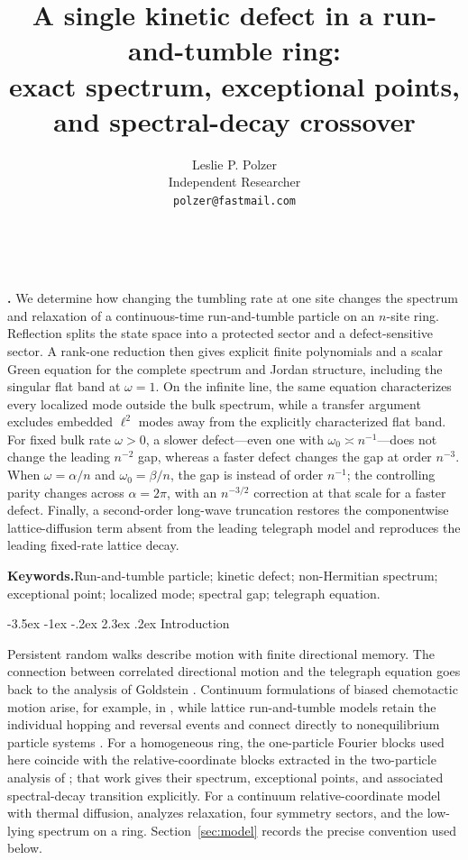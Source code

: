 \documentclass[twoside,10pt]{article}
\title{A single kinetic defect in a run-and-tumble ring:\\
exact spectrum, exceptional points, and spectral-decay crossover}
\author{Leslie P. Polzer\\
  \normalfont\small Independent Researcher\\
  \normalfont\small\texttt{polzer@fastmail.com}}
\date{}
\makeatletter
\numberwithin{equation}{section}
\theoremstyle{slbody}
\theoremstyle{definition}
\theoremstyle{remark}
\renewcommand{\section}{%
  \@startsection{section}{1}{\z@}%
    {-3.5ex \@plus -1ex \@minus -.2ex}%
    {2.3ex \@plus .2ex}%
    {\normalfont\large\bfseries}}
\renewcommand{\maketitle}{%
  \begin{center}
    {\large\bfseries\@title}\\
    \vskip36pt
    \ifx\@author\@empty
      \vspace{55pt}\par
    \else
      {\scshape\@author}\par
      \medskip
      {\small\@date}\par
    \fi
    \vskip36pt
  \end{center}}
\renewenvironment{abstract}
  {\quotation\noindent\small{\bfseries\abstractname.\enspace}}
  {\endquotation}
\makeatother
\begin{document}
\maketitle

\begin{abstract}
We determine how changing the tumbling rate at one site changes the spectrum
and relaxation of a continuous-time run-and-tumble particle on an $n$-site
ring.  Reflection splits the state space into a protected sector and a
defect-sensitive sector.  A rank-one reduction then gives explicit finite
polynomials and a scalar Green equation for the complete spectrum and Jordan
structure, including the singular flat band at $\omega=1$.  On the infinite
line, the same equation characterizes every localized mode outside the bulk
spectrum, while a transfer argument excludes embedded $\ell^2$ modes away
from the explicitly characterized
flat band.  For fixed bulk rate $\omega>0$, a slower defect---even one with
$\omega_0\asymp n^{-1}$---does not change the leading $n^{-2}$ gap, whereas a
faster defect changes the gap at order $n^{-3}$.  When
$\omega=\alpha/n$ and $\omega_0=\beta/n$, the gap is instead of order
$n^{-1}$; the controlling parity changes across $\alpha=2\pi$, with an
$n^{-3/2}$ correction at that scale for a faster defect.  Finally, a
second-order long-wave truncation restores the componentwise lattice-diffusion
term absent from the leading telegraph model and reproduces the leading
fixed-rate lattice decay.
\end{abstract}

\vskip5pt
\noindent\textbf{Keywords.}\enspace Run-and-tumble particle; kinetic
defect; non-Hermitian spectrum; exceptional point; localized mode;
spectral gap; telegraph equation.

\clearpage
\setcounter{tocdepth}{2}
\tableofcontents
\clearpage
\baselineskip=13.5pt

\section{Introduction}

Persistent random walks describe motion with finite directional memory.
The connection between correlated directional motion and the telegraph
equation goes back to the analysis of Goldstein \cite{Goldstein1951}.
Continuum formulations
of biased chemotactic motion arise, for example, in \cite{Schnitzer1993},
while lattice run-and-tumble models retain the
individual hopping and reversal events and connect directly to
nonequilibrium particle systems
\cite{ThompsonTailleurCatesBlythe2011}.  For a homogeneous ring, the
one-particle Fourier blocks used here coincide with the
relative-coordinate blocks extracted in the two-particle analysis of
\cite{MallminBlytheEvans2019}; that work gives their spectrum,
exceptional points, and associated spectral-decay transition explicitly.
For a continuum relative-coordinate model with thermal diffusion,
\cite[Secs.~3.2--3.3]{DasDharKundu2020} analyzes relaxation, four
symmetry sectors, and the low-lying spectrum on a ring.
Section~\ref{sec:model} records the precise convention used below.
\end{document}

